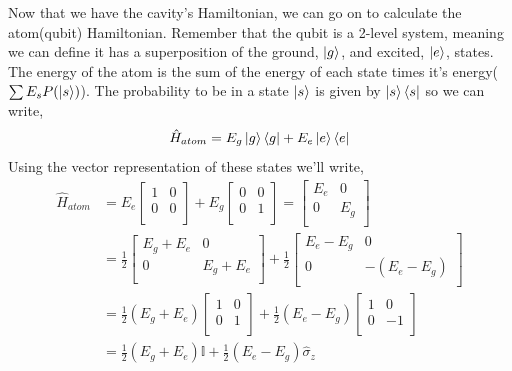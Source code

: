 \documentclass[english, a4paper, 12pt, twoside]{article}
\numberwithin{equation}{section} %
\begin{document}
Now that we have the cavity's Hamiltonian, we can go on to calculate the atom(qubit) Hamiltonian. \newline
Remember that the qubit is a 2-level system, meaning we can define it has a superposition of the ground, $\ket{g}$, and excited, $\ket{e}$, states. The energy of the atom is the sum of the energy of each state times it's energy($\sum E_sP(\ket{s})$). The probability to be in a state $\ket{s}$ is given by $\ket{s}\bra{s}$ so we can write,
\begin{equation}
    \hat{H}_{atom} = E_g\ket{g}\bra{g} + E_e\ket{e}\bra{e}
\end{equation}
Using the vector representation of these states we'll write,
    \begin{align*} 
        \hat{H}_{atom} &= 
        E_e \begin{bmatrix}
        1 & 0     \\
        0   & 0   \\
        \end{bmatrix}
        + E_g \begin{bmatrix}
        0 & 0     \\
        0   & 1   \\
        \end{bmatrix} = 
        \begin{bmatrix}
        E_e & 0     \\
        0   & E_g   \\
        \end{bmatrix} \\
        &= \frac{1}{2}\begin{bmatrix}
        E_g + E_e & 0          \\
        0         & E_g + E_e  \\
        \end{bmatrix} +
        \frac{1}{2}\begin{bmatrix}
        E_e - E_g & 0          \\
        0         & -(E_e - E_g)  \\
        \end{bmatrix} \\
        &= \frac{1}{2}(E_g + E_e)\begin{bmatrix}
        1 & 0          \\
        0         & 1  \\
        \end{bmatrix} +
        \frac{1}{2}(E_e - E_g)\begin{bmatrix}
        1 & 0          \\
        0         & -1  \\
        \end{bmatrix} \\
        &= \frac{1}{2}(E_g + E_e)\mathbb{I} + \frac{1}{2}(E_e - E_g)\hat{\sigma}_z
    \end{align*}
\end{document}
